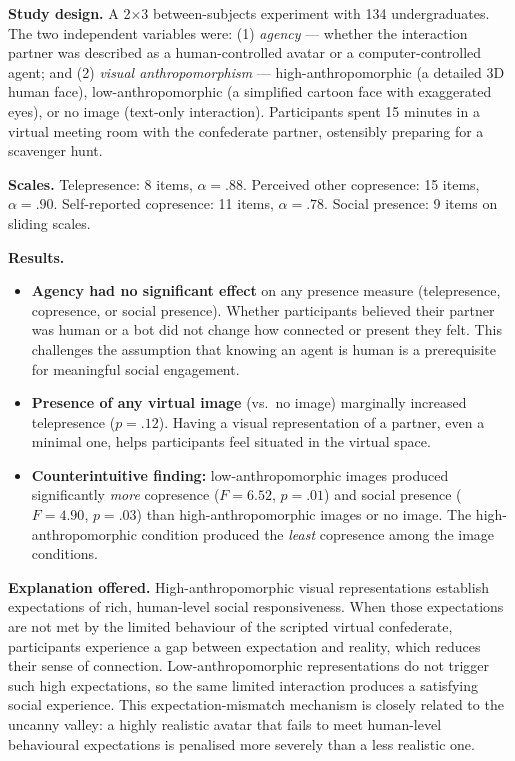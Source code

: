 \documentclass[11pt, a4paper]{article}
\begin{document}
\textbf{Study design.} A 2$\times$3 between-subjects experiment with 134 undergraduates. The two independent variables were: (1) \textit{agency} --- whether the interaction partner was described as a human-controlled avatar or a computer-controlled agent; and (2) \textit{visual anthropomorphism} --- high-anthropomorphic (a detailed 3D human face), low-anthropomorphic (a simplified cartoon face with exaggerated eyes), or no image (text-only interaction). Participants spent 15 minutes in a virtual meeting room with the confederate partner, ostensibly preparing for a scavenger hunt.

\textbf{Scales.} Telepresence: 8 items, $\alpha = .88$. Perceived other copresence: 15 items, $\alpha = .90$. Self-reported copresence: 11 items, $\alpha = .78$. Social presence: 9 items on sliding scales.

\textbf{Results.}
\begin{itemize}[leftmargin=2em]
  \item \textbf{Agency had no significant effect} on any presence measure (telepresence, copresence, or social presence). Whether participants believed their partner was human or a bot did not change how connected or present they felt. This challenges the assumption that knowing an agent is human is a prerequisite for meaningful social engagement.
  \item \textbf{Presence of any virtual image} (vs.\ no image) marginally increased telepresence ($p = .12$). Having a visual representation of a partner, even a minimal one, helps participants feel situated in the virtual space.
  \item \textbf{Counterintuitive finding:} low-anthropomorphic images produced significantly \textit{more} copresence ($F = 6.52$, $p = .01$) and social presence ($F = 4.90$, $p = .03$) than high-anthropomorphic images or no image. The high-anthropomorphic condition produced the \textit{least} copresence among the image conditions.
\end{itemize}

\textbf{Explanation offered.} High-anthropomorphic visual representations establish expectations of rich, human-level social responsiveness. When those expectations are not met by the limited behaviour of the scripted virtual confederate, participants experience a gap between expectation and reality, which reduces their sense of connection. Low-anthropomorphic representations do not trigger such high expectations, so the same limited interaction produces a satisfying social experience. This expectation-mismatch mechanism is closely related to the uncanny valley: a highly realistic avatar that fails to meet human-level behavioural expectations is penalised more severely than a less realistic one.
\end{document}
